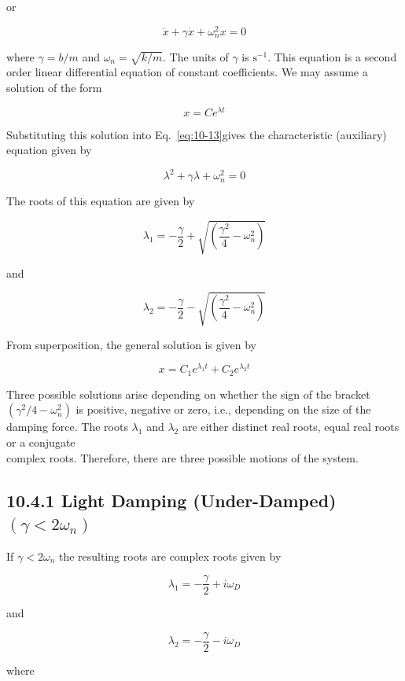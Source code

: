 \documentclass[10pt]{article}
\numberwithin{equation}{section}
\begin{document}
or


\begin{equation}
\ddot{x}+\gamma \dot{x}+\omega_{n}^{2} x=0 \label{eq:10-13}
\end{equation}


where $\gamma=b / m$ and $\omega_{n}=\sqrt{k / m}$. The units of $\gamma$ is $\mathrm{s}^{-1}$. This equation is a second order linear differential equation of constant coefficients. We may assume a solution of the form

$$
x=C e^{\lambda t}
$$

Substituting this solution into Eq.~\eqref{eq:10-13}gives the characteristic (auxiliary) equation given by

$$
\lambda^{2}+\gamma \lambda+\omega_{n}^{2}=0
$$

The roots of this equation are given by

$$
\lambda_{1}=-\frac{\gamma}{2}+\sqrt{\left(\frac{\gamma^{2}}{4}-\omega_{n}^{2}\right)}
$$

and

$$
\lambda_{2}=-\frac{\gamma}{2}-\sqrt{\left(\frac{\gamma^{2}}{4}-\omega_{n}^{2}\right)}
$$

From superposition, the general solution is given by


\begin{equation}
x=C_{1} e^{\lambda_{1} t}+C_{2} e^{\lambda_{2} t} \label{eq:10-14}
\end{equation}


Three possible solutions arise depending on whether the sign of the bracket $\left(\gamma^{2} / 4-\omega_{n}^{2}\right)$ is positive, negative or zero, i.e., depending on the size of the damping force. The roots $\lambda_{1}$ and $\lambda_{2}$ are either distinct real roots, equal real roots or a conjugate\\
complex roots. Therefore, there are three possible motions of the system.

\subsection*{10.4.1 Light Damping (Under-Damped) $\left(\gamma<2 \omega_{n}\right)$}
If $\gamma<2 \omega_{n}$ the resulting roots are complex roots given by

$$
\lambda_{1}=-\frac{\gamma}{2}+i \omega_{D}
$$

and

$$
\lambda_{2}=-\frac{\gamma}{2}-i \omega_{D}
$$

where
\end{document}
